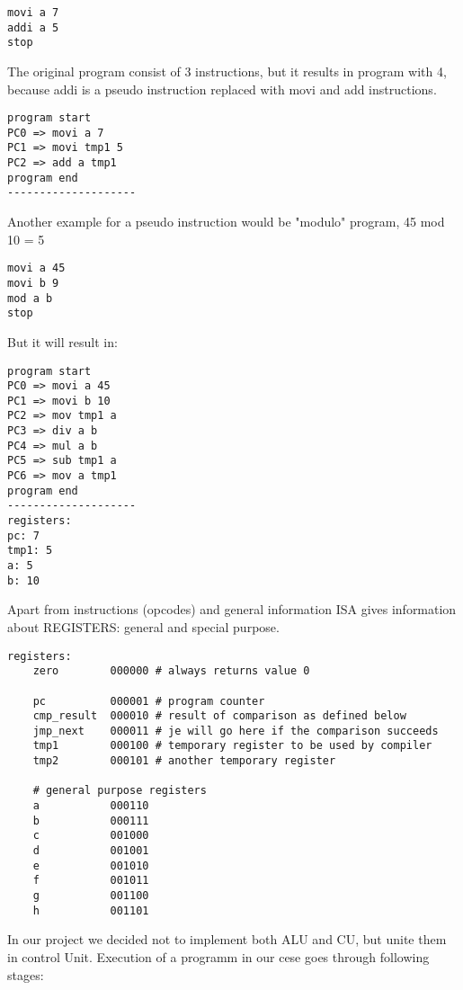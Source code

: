 \documentclass[11pt,twoside,a4paper]{article}
\begin{document}
\begin{verbatim}
movi a 7
addi a 5
stop
\end{verbatim}
The original program consist of 3 instructions, but it results in program with 4, because addi is a pseudo instruction replaced with movi and add instructions.
\begin{verbatim}
program start
PC0 => movi a 7
PC1 => movi tmp1 5
PC2 => add a tmp1
program end
--------------------
\end{verbatim}
Another example for a pseudo instruction would be "modulo" program, 45 mod 10 = 5
\begin{verbatim}
movi a 45
movi b 9
mod a b
stop
\end{verbatim}
But it will result in:
\begin{verbatim}
program start
PC0 => movi a 45
PC1 => movi b 10
PC2 => mov tmp1 a
PC3 => div a b
PC4 => mul a b
PC5 => sub tmp1 a
PC6 => mov a tmp1
program end
--------------------
registers:
pc: 7
tmp1: 5
a: 5
b: 10
\end{verbatim}
Apart from instructions (opcodes) and general information ISA gives information about REGISTERS: general and special purpose.
\begin{verbatim}
registers:
	zero 		000000 # always returns value 0
	
	pc			000001 # program counter
	cmp_result  000010 # result of comparison as defined below
	jmp_next    000011 # je will go here if the comparison succeeds
	tmp1        000100 # temporary register to be used by compiler
	tmp2		000101 # another temporary register

	# general purpose registers
	a       	000110
	b       	000111
	c      	 	001000
	d       	001001
	e       	001010
	f       	001011
	g      	 	001100
	h       	001101
\end{verbatim}
In our project we decided not to implement both ALU and CU, but unite them in control Unit. Execution of a programm in our cese goes through following stages:
\end{document}
